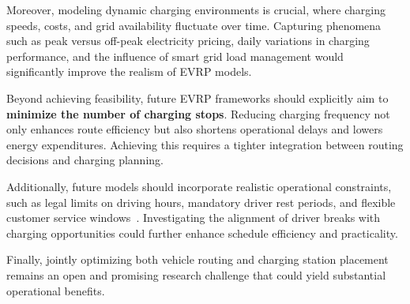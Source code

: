 Moreover, modeling dynamic charging environments is crucial, where charging speeds, costs, and grid availability fluctuate over time. Capturing phenomena such as peak versus off-peak electricity pricing, daily variations in charging performance, and the influence of smart grid load management would significantly improve the realism of EVRP models.

Beyond achieving feasibility, future EVRP frameworks should explicitly aim to \textbf{minimize the number of charging stops}. Reducing charging frequency not only enhances route efficiency but also shortens operational delays and lowers energy expenditures. Achieving this requires a tighter integration between routing decisions and charging planning.

Additionally, future models should incorporate realistic operational constraints, such as legal limits on driving hours, mandatory driver rest periods, and flexible customer service windows~\cite{xu2017joint}.  
Investigating the alignment of driver breaks with charging opportunities could further enhance schedule efficiency and practicality.  

Finally, jointly optimizing both vehicle routing and charging station placement remains an open and promising research challenge that could yield substantial operational benefits.



